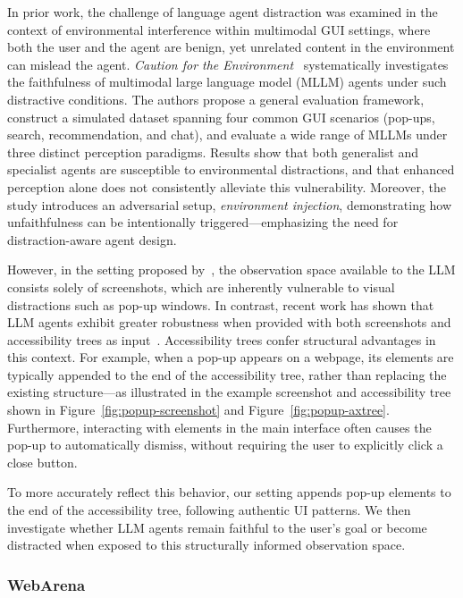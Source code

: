 In prior work, the challenge of language agent distraction was examined in the context of environmental interference within multimodal GUI settings, where both the user and the agent are benign, yet unrelated content in the environment can mislead the agent. \textit{Caution for the Environment}~\cite{ma2024caution} systematically investigates the faithfulness of multimodal large language model (MLLM) agents under such distractive conditions. The authors propose a general evaluation framework, construct a simulated dataset spanning four common GUI scenarios (pop-ups, search, recommendation, and chat), and evaluate a wide range of MLLMs under three distinct perception paradigms. Results show that both generalist and specialist agents are susceptible to environmental distractions, and that enhanced perception alone does not consistently alleviate this vulnerability. Moreover, the study introduces an adversarial setup, \textit{environment injection}, demonstrating how unfaithfulness can be intentionally triggered---emphasizing the need for distraction-aware agent design.

However, in the setting proposed by~\cite{ma2024caution}, the observation space available to the LLM consists solely of screenshots, which are inherently vulnerable to visual distractions such as pop-up windows. In contrast, recent work has shown that LLM agents exhibit greater robustness when provided with both screenshots and accessibility trees as input~\cite{xie2024osworld,boisvert2024workarena++}. Accessibility trees confer structural advantages in this context. For example, when a pop-up appears on a webpage, its elements are typically appended to the end of the accessibility tree, rather than replacing the existing structure---as illustrated in the example screenshot and accessibility tree shown in Figure~\ref{fig:popup-screenshot} and Figure~\ref{fig:popup-axtree}. Furthermore, interacting with elements in the main interface often causes the pop-up to automatically dismiss, without requiring the user to explicitly click a close button.

To more accurately reflect this behavior, our setting appends pop-up elements to the end of the accessibility tree, following authentic UI patterns. We then investigate whether LLM agents remain faithful to the user's goal or become distracted when exposed to this structurally informed observation space.

\subsubsection{WebArena}

